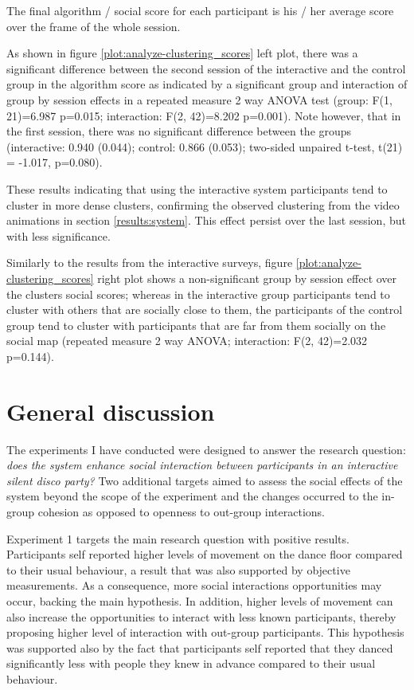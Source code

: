\documentclass[a4paper,11pt]{article}
\begin{document}
{The final algorithm / social score for each participant is his / her average score over the frame of the whole session.

As shown in figure \ref{plot:analyze-clustering_scores} left plot, there was a significant difference between the second session of the interactive and the control group in the algorithm score as indicated by a significant group and interaction of group by session effects in a repeated measure 2 way ANOVA test (group: F(1, 21)=6.987 p=0.015; interaction: F(2, 42)=8.202 p=0.001).
Note however, that in the first session, there was no significant difference between the groups (interactive: 0.940 (0.044); control: 0.866 (0.053); two-sided unpaired t-test, t(21) = -1.017, p=0.080).

These results indicating that using the interactive system participants tend to cluster in more dense clusters, confirming the observed clustering from the video animations in section \ref{results:system}.
This effect persist over the last session, but with less significance.

Similarly to the results from the interactive surveys, figure \ref{plot:analyze-clustering_scores} right plot shows a non-significant group by session effect over the clusters social scores; whereas in the interactive group participants tend to cluster with others that are socially close to them, the participants of the control group tend to cluster with participants that are far from them socially on the social map (repeated measure 2 way ANOVA; interaction: F(2, 42)=2.032 p=0.144).

\section{General discussion}

The experiments I have conducted were designed to answer the research question: \emph{does the system enhance social interaction between participants in an interactive silent disco party?}
Two additional targets aimed to assess the social effects of the system beyond the scope of the experiment and the changes occurred to the in-group cohesion as opposed to openness to out-group interactions.

Experiment 1 targets the main research question with positive results.
Participants self reported higher levels of movement on the dance floor compared to their usual behaviour, a result that was also supported by objective measurements.
As a consequence, more social interactions opportunities may occur, backing the main hypothesis.
In addition, higher levels of movement can also increase the opportunities to interact with less known participants, thereby proposing higher level of interaction with out-group participants.
This hypothesis was supported also by the fact that participants self reported that they danced significantly less with people they knew in advance compared to their usual behaviour.

}
\end{document}
